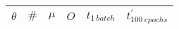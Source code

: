 \documentclass{article}
\begin{document}
\begin{table}
\Centering
\begin{tabular}{@{}cccccc@{}}
\toprule
$\theta$ & $\#$ & $\mu$ & $O$ & $t_{1\ batch}$ & $t_{100\ epochs}^{'}$ \\
\midrule
\bottomrule
\end{tabular}
\end{table}
\end{document}
